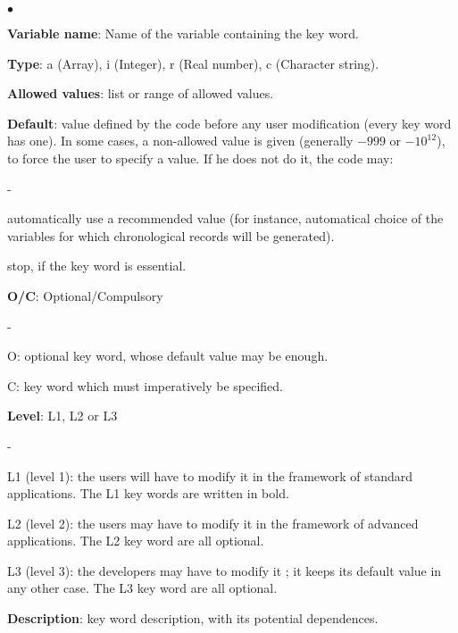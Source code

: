 \begin{list}{$\bullet$}{}
\item \textbf{Variable name}: Name of the variable containing the key word.

\item \textbf{Type}: a (Array), i (Integer), r (Real number), c
      (Character string).

\item \textbf{Allowed values}: list or range of allowed values.

\item \textbf{Default}: value defined by the code before any user
      modification (every key word has one). In some cases, a
      non-allowed value is given (generally $-999$ or $-10^{12}$), to force the
      user to specify a value. If he does not do it, the code may:
\begin{list}{-}{}
\item automatically use a recommended value (for instance, automatical
      choice of the variables for which chronological records will be
      generated).

\item stop, if the key word is essential.
\end{list}

\item \textbf{O/C}: Optional/Compulsory
\begin{list}{-}{}
\item O: optional key word, whose default value may be enough.

\item C: key word which must imperatively be specified.
\end{list}

\item \textbf{Level}: L1, L2 or L3
\begin{list}{-}{}
\item L1 (level 1): the users will have to modify it in the framework of
      standard applications. The L1 key words are written in bold.

\item L2 (level 2): the users may have to modify it in the framework of
      advanced applications. The L2 key word are all optional.

\item L3 (level 3): the developers may have to modify it ; it keeps its
      default value in any other case. The L3 key word are all optional.
\end{list}

\item \textbf{Description}:  key word description, with its potential
      dependences.

\end{list}

